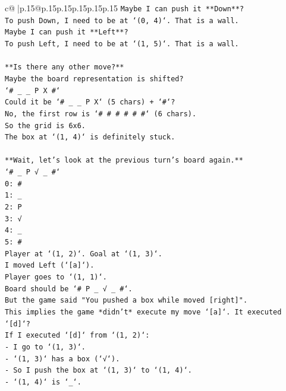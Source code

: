 \documentclass{article}
\begin{document}
{\begin{supertabular}{c@{$\;$}|p{.15\linewidth}@{}p{.15\linewidth}p{.15\linewidth}p{.15\linewidth}p{.15\linewidth}p{.15\linewidth}}
{{{\texttt{Maybe I can push it **Down**?} \\
\texttt{To push Down, I need to be at `(0, 4)`. That is a wall.} \\
\texttt{Maybe I can push it **Left**?} \\
\texttt{To push Left, I need to be at `(1, 5)`. That is a wall.} \\
\\ 
\texttt{**Is there any other move?**} \\
\texttt{Maybe the board representation is shifted?} \\
\texttt{`\# \_ \_ P X \#`} \\
\texttt{Could it be `\# \_ \_ P X` (5 chars) + `\#`?} \\
\texttt{No, the first row is `\# \# \# \# \# \#` (6 chars).} \\
\texttt{So the grid is 6x6.} \\
\texttt{The box at `(1, 4)` is definitely stuck.} \\
\\ 
\texttt{**Wait, let's look at the previous turn's board again.**} \\
\texttt{`\# \_ P √ \_ \#`} \\
\texttt{0: \#} \\
\texttt{1: \_} \\
\texttt{2: P} \\
\texttt{3: √} \\
\texttt{4: \_} \\
\texttt{5: \#} \\
\texttt{Player at `(1, 2)`. Goal at `(1, 3)`.} \\
\texttt{I moved Left (`{[}a{]}`).} \\
\texttt{Player goes to `(1, 1)`.} \\
\texttt{Board should be `\# P \_ √ \_ \#`.} \\
\texttt{But the game said "You pushed a box while moved {[}right{]}".} \\
\texttt{This implies the game *didn't* execute my move `{[}a{]}`. It executed `{[}d{]}`?} \\
\texttt{If I executed `{[}d{]}` from `(1, 2)`:} \\
\texttt{{-} I go to `(1, 3)`.} \\
\texttt{{-} `(1, 3)` has a box (`√`).} \\
\texttt{{-} So I push the box at `(1, 3)` to `(1, 4)`.} \\
\texttt{{-} `(1, 4)` is `\_`.} \\
}}}
\end{supertabular}}
\end{document}
